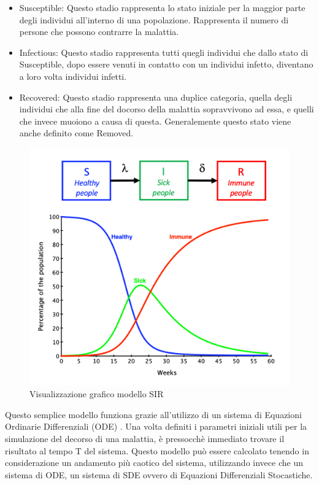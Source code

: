 \begin{itemize}
    \item Susceptible: Questo stadio rappresenta lo stato iniziale per la maggior parte
    degli individui all'interno di una popolazione. Rappresenta il numero di 
    persone che possono contrarre la malattia.
    \item Infectious: Questo stadio rappresenta tutti quegli individui che dallo 
    stato di Susceptible, dopo essere venuti in contatto con un individui infetto, 
    diventano a loro volta individui infetti.
    \item Recovered: Questo stadio rappresenta una duplice categoria, quella degli
    individui che alla fine del docorso della malattia sopravvivono ad essa, e 
    quelli che invece muoiono a causa di questa. Generalemente questo stato viene
    anche definito come Removed.
\end{itemize}

\newpage

\begin{figure}[h]
    \includegraphics[width=\linewidth]{img/SIR-model.png}
    \caption{Visualizzazione grafico modello SIR} 
    \label{fig:SIR_model_graphic}
\end{figure}

Questo semplice modello funziona grazie all'utilizzo di un sistema di Equazioni
Ordinarie Differenziali (ODE) \cite{Brauer2008}. Una volta definiti i parametri iniziali 
utili per la simulazione del decorso di una malattia, è pressocchè immediato trovare
il risultato al tempo T del sistema. Questo modello può essere calcolato tenendo 
in considerazione un andamento più caotico del sistema, utilizzando invece che 
un sistema di ODE, un sistema di SDE \cite{Allen2008} ovvero 
di Equazioni Differenziali Stocastiche.


